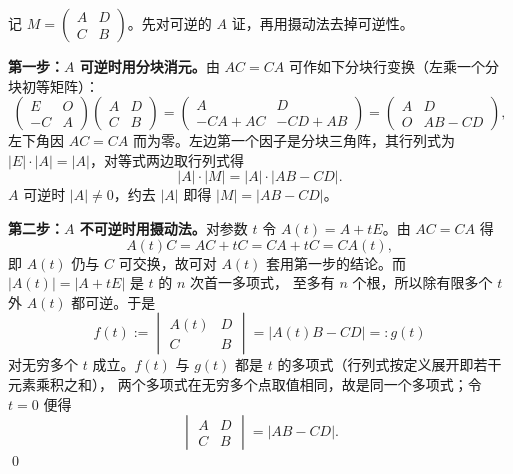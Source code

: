 \begin{solution}
记 $M=\begin{pmatrix}A&D\\C&B\end{pmatrix}$。先对可逆的 $A$ 证，再用摄动法去掉可逆性。

\textbf{第一步：$A$ 可逆时用分块消元。}由 $AC=CA$ 可作如下分块行变换（左乘一个分块初等矩阵）：
\[
\begin{pmatrix}E&O\\-C&A\end{pmatrix}\begin{pmatrix}A&D\\C&B\end{pmatrix}
=\begin{pmatrix}A&D\\-CA+AC&-CD+AB\end{pmatrix}
=\begin{pmatrix}A&D\\O&AB-CD\end{pmatrix},
\]
左下角因 $AC=CA$ 而为零。左边第一个因子是分块三角阵，其行列式为 $|E|\cdot|A|=|A|$，对等式两边取行列式得
\[
|A|\cdot|M|=|A|\cdot|AB-CD| .
\]
$A$ 可逆时 $|A|\ne0$，约去 $|A|$ 即得 $|M|=|AB-CD|$。

\textbf{第二步：$A$ 不可逆时用摄动法。}对参数 $t$ 令 $A(t)=A+tE$。由 $AC=CA$ 得
\[
A(t)C=AC+tC=CA+tC=CA(t),
\]
即 $A(t)$ 仍与 $C$ 可交换，故可对 $A(t)$ 套用第一步的结论。而 $|A(t)|=|A+tE|$ 是 $t$ 的 $n$ 次首一多项式，
至多有 $n$ 个根，所以除有限多个 $t$ 外 $A(t)$ 都可逆。于是
\[
f(t):=\begin{vmatrix}A(t)&D\\C&B\end{vmatrix}=\bigl|A(t)B-CD\bigr|=:g(t)
\]
对无穷多个 $t$ 成立。$f(t)$ 与 $g(t)$ 都是 $t$ 的多项式（行列式按定义展开即若干元素乘积之和），
两个多项式在无穷多个点取值相同，故是同一个多项式；令 $t=0$ 便得
\[
\begin{vmatrix}A&D\\C&B\end{vmatrix}=|AB-CD| .
\]
\qed
{}
\end{solution}
